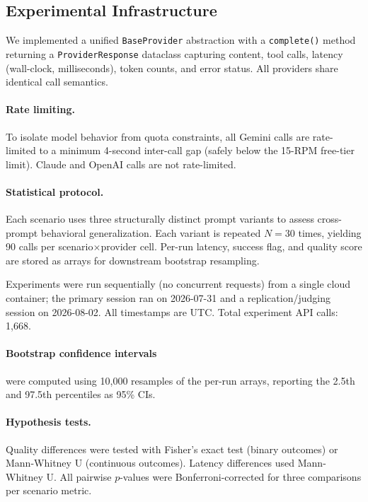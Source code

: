 \documentclass[11pt]{article}
\begin{document}
\subsection{Experimental Infrastructure}

We implemented a unified \texttt{BaseProvider} abstraction with a \texttt{complete()} method returning a \texttt{ProviderResponse} dataclass capturing content, tool calls, latency (wall-clock, milliseconds), token counts, and error status. All providers share identical call semantics.

\paragraph{Rate limiting.} To isolate model behavior from quota constraints, all Gemini calls are rate-limited to a minimum 4-second inter-call gap (safely below the 15-RPM free-tier limit). Claude and OpenAI calls are not rate-limited.

\paragraph{Statistical protocol.} Each scenario uses three structurally distinct prompt variants to assess cross-prompt behavioral generalization. Each variant is repeated $N{=}30$ times, yielding 90 calls per scenario$\times$provider cell. Per-run latency, success flag, and quality score are stored as arrays for downstream bootstrap resampling.

Experiments were run sequentially (no concurrent requests) from a single cloud container; the primary session ran on 2026-07-31 and a replication/judging session on 2026-08-02. All timestamps are UTC. Total experiment API calls: 1,668.

\paragraph{Bootstrap confidence intervals} were computed using 10,000 resamples of the per-run arrays, reporting the 2.5th and 97.5th percentiles as 95\% CIs.

\paragraph{Hypothesis tests.} Quality differences were tested with Fisher's exact test (binary outcomes) or Mann-Whitney U (continuous outcomes). Latency differences used Mann-Whitney U. All pairwise $p$-values were Bonferroni-corrected for three comparisons per scenario metric.
\end{document}
